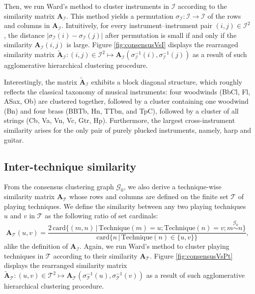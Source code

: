 \documentclass{bmcart}
\newcommand{\Card}{\mathrm{card}}
\begin{document}
Then, we run Ward's method to cluster instruments in $\mathcal{I}$ according to the similarity matrix $\mathbf{A}_{\mathcal{I}}$.
This method yields a permutation $\sigma_{\mathcal{I}}: \mathcal{I} \rightarrow \mathcal{I}$ of the rows and columns in $\mathbf{A}_{\mathcal{I}}$.
Intuitively, for every instrument--instrument pair $(i, j) \in \mathcal{I}^2$, the distance $\vert \sigma_{\mathcal{I}}(i) - \sigma_{\mathcal{I}}(j) \vert$ after permutation is small if and only if the similarity $\mathbf{A}_{\mathcal{I}}(i, j)$ is large.
Figure \ref{fig:consensusVsI} displays the rearranged similarity matrix $\widetilde{\mathbf{A}}_{\mathcal{I}} : (i,j)\in \mathcal{I}^2 \mapsto \mathbf{A}_{\mathcal{I}}(\sigma_{\mathcal{I}}^{-1}(i), \sigma_{\mathcal{I}}^{-1}(j))$ as a result of such agglomerative hierarchical clustering procedure.

Interestingly, the matrix $\widetilde{\mathbf{A}}_{\mathcal{I}}$ exhibits a block diagonal structure, which roughly reflects the classical taxonomy of musical instruments: four woodwinds (BbCl, Fl, ASax, Ob) are clustered together, followed by a cluster containing one woodwind (Bn) and four brass (BBTb, Hn, TTbn, and TpC), followed by a cluster of all strings (Cb, Va, Vn, Vc, Gtr, Hp).
Furthermore, the largest cross-instrument similarity arises for the only pair of purely plucked instruments, namely, harp and guitar.


\subsection*{Inter-technique similarity}
From the consensus clustering graph $\mathcal{G}_0$, we also derive a technique-wise similarity matrix $\mathbf{A}_{\mathcal{T}}$ whose rows and columns are defined on the finite set $\mathcal{T}$ of playing techniques.
We define the similarity between any two playing techniques $u$ and $v$ in $\mathcal{T}$ as the following ratio of set cardinals:
\[
\mathbf{A}_{\mathcal{T}}(u,v) = \dfrac{
2\,\Card \big\{ (m, n) \,\vert\, \mathrm{Technique}(m)=u ; \mathrm{Technique}(n)=v ; m \overset{\mathcal{G}_0}{\sim} n \big\}
}{
\Card \big\{n \,\vert\, \mathrm{Technique}(n) \in \{ u, v \} \big\}
},
\]
alike the definition of $\mathbf{A}_{\mathcal{I}}$.
Again, we run Ward's method to cluster playing techniques in $\mathcal{T}$ according to their similarity $\mathbf{A}_{\mathcal{T}}$.
Figure \ref{fig:consensusVsPt} displays the rearranged similarity matrix $\widetilde{\mathbf{A}}_{\mathcal{T}} : (u,v)\in \mathcal{T}^2 \mapsto \mathbf{A}_{\mathcal{T}}(\sigma_{\mathcal{T}}^{-1}(u), \sigma_{\mathcal{T}}^{-1}(v))$ as a result of such agglomerative hierarchical clustering procedure.
\end{document}
